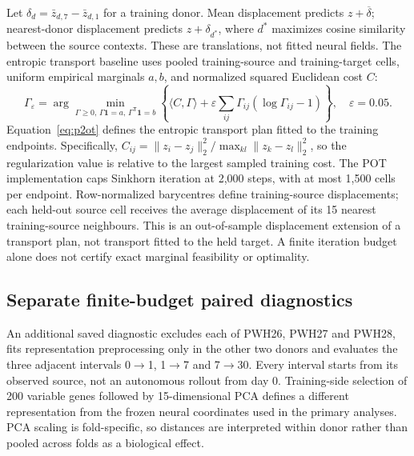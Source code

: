 Let $\delta_d=\bar z_{d,7}-\bar z_{d,1}$ for a training donor. Mean displacement predicts $z+\overline\delta$; nearest-donor displacement predicts $z+\delta_{d^*}$, where $d^*$ maximizes cosine similarity between the source contexts. These are translations, not fitted neural fields. The entropic transport baseline uses pooled training-source and training-target cells, uniform empirical marginals $a,b$, and normalized squared Euclidean cost $C$:
\begin{equation}
\Gamma_\varepsilon=\arg\min_{\Gamma\geq0,\,\Gamma\mathbf1=a,\,\Gamma^{\mathsf T}\mathbf1=b}
\left\{\langle C,\Gamma\rangle+\varepsilon\sum_{ij}\Gamma_{ij}(\log\Gamma_{ij}-1)\right\},\quad\varepsilon=0.05.\label{eq:p2ot}
\end{equation}
Equation~\eqref{eq:p2ot} defines the entropic transport plan fitted to the training endpoints. Specifically, $C_{ij}=\|z_i-z_j\|_2^2/\max_{kl}\|z_k-z_l\|_2^2$, so the regularization value is relative to the largest sampled training cost. The POT implementation caps Sinkhorn iteration at 2,000 steps, with at most 1,500 cells per endpoint. Row-normalized barycentres define training-source displacements; each held-out source cell receives the average displacement of its 15 nearest training-source neighbours. This is an out-of-sample displacement extension of a transport plan, not transport fitted to the held target. A finite iteration budget alone does not certify exact marginal feasibility or optimality.

\subsection{Separate finite-budget paired diagnostics}
An additional saved diagnostic excludes each of PWH26, PWH27 and PWH28, fits representation preprocessing only in the other two donors and evaluates the three adjacent intervals 0$\rightarrow$1, 1$\rightarrow$7 and 7$\rightarrow$30. Every interval starts from its observed source, not an autonomous rollout from day 0. Training-side selection of 200 variable genes followed by 15-dimensional PCA defines a different representation from the frozen neural coordinates used in the primary analyses. PCA scaling is fold-specific, so distances are interpreted within donor rather than pooled across folds as a biological effect.

